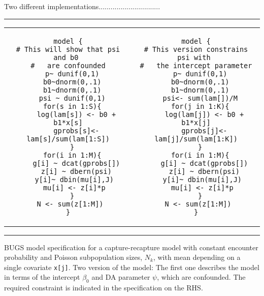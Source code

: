 Two different implementations...............................



\begin{panel}[htp]   
\renewcommand{\baselinestretch}{1.0}
\centering
\rule[0.15in]{\textwidth}{.03in}
\begin{tabular}{cc}
\begin{minipage}{3.25in}
{\small
\begin{verbatim}
model {
# This will show that psi and b0 
#   are confounded
  p~ dunif(0,1)
  b0~dnorm(0,.1)
  b1~dnorm(0,.1)
  psi ~ dunif(0,1)
  for(s in 1:S){
    log(lam[s]) <- b0 + b1*x[s]
    gprobs[s]<- lam[s]/sum(lam[1:S])
  }
  for(i in 1:M){
    g[i] ~ dcat(gprobs[])
    z[i] ~ dbern(psi)
   y[i]~ dbin(mu[i],J)
   mu[i] <- z[i]*p
  }
  N <- sum(z[1:M]) 
}
\end{verbatim}
}
\end{minipage}
&
\begin{minipage}{3.25in}
{\small
\begin{verbatim}
model {
# This version constrains psi with 
#   the intercept parameter
  p~ dunif(0,1)
  b0~dnorm(0,.1)
  b1~dnorm(0,.1)
  psi<- sum(lam[])/M
  for(j in 1:K){
    log(lam[j]) <- b0 + b1*x[j]
    gprobs[j]<- lam[j]/sum(lam[1:K])
  }
  for(i in 1:M){
    g[i] ~ dcat(gprobs[])
    z[i] ~ dbern(psi)
   y[i]~ dbin(mu[i],J)
   mu[i] <- z[i]*p
  }
  N <- sum(z[1:M]) 
}
\end{verbatim}
}
\end{minipage}
\end{tabular}
\rule[-0.15in]{\textwidth}{.03in}
\caption{BUGS model specification for a capture-recapture model with
  constant encounter probability and Poisson subpopulation sizes,
  $N_{k}$, with mean depending on a single covariate \mbox{\tt x[j]}. 
Two version of the model: The first one describes the model in terms
of the intercept $\beta_0$ and DA parameter $\psi$, which are
confounded. The required constraint is indicated in the specification
on the RHS. 
}
\label{panel.wbcode}
\end{panel}






